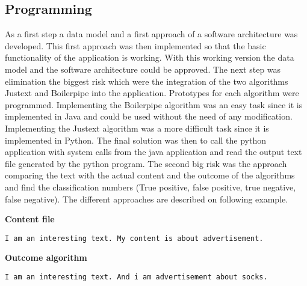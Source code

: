 \subsection{Programming}

As a first step a data model and a first approach of a software architecture was developed. This first approach was then implemented so that the basic functionality of the application is working. With this working version the data model and the software architecture could be approved. The next step was elimination the biggest risk which were the integration of the two algorithms Justext and Boilerpipe into the application. Prototypes for each algorithm were programmed. Implementing the Boilerpipe algorithm was an easy task since it is implemented in Java and could be used without the need of any modification. Implementing the Justext algorithm was a more difficult task since it is implemented in Python. The final solution was then to call the python application with system calls from the java application and read the output text file generated by the python program. 
The second big risk was the approach comparing the text with the actual content and the outcome of the algorithms and find the classification numbers (True positive, false positive, true negative, false negative). The different approaches are described on following example.

\textbf{Content file}

\texttt{I am an interesting text. My content is about advertisement.}

\textbf{Outcome algorithm}

\texttt{I am an interesting text. And i am advertisement about socks. }


